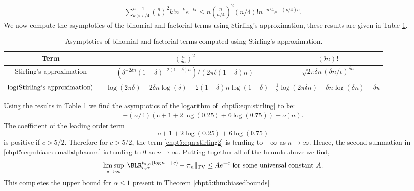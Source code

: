 \documentclass[11pt]{report}
\begin{document}
\begin{eqnarray}
\sum_{k>n/4}^{n-1} {n\choose k}^{2} k! n^{-k} e^{-k c} \leq  n {n\choose n/4}^{2} ( n/4)!  n^{-n/4} e^{-(n/4) c} .\label{chpt5:eqn:stirling}
\end{eqnarray}
We now compute the asymptotics of the binomial and factorial terms using Stirling's approximation, these results are given in Table \ref{chpt4:table:stirlings}. 
\begin{table}[H]
	
	
	\begin{adjustbox}{width=\columnwidth,center}
		\renewcommand{\arraystretch}{1.3}
		\begin{tabular}{c|c|c}
			Term    & ${n\choose \delta n}^{2}$ & $(\delta n)!$  \\\hline
			Stirling's approximation & $(\delta^{-2\delta n} (1-\delta)^{-2(1-\delta)n} ) / (2\pi\delta(1-\delta)n)$ & $\sqrt{2\pi \delta n}\left(\delta n / e\right)^{\delta n}$ \\\hline
			$\log (\textnormal{Stirling's approximation})$ & $-\log(2\pi \delta) -2\delta n\log (\delta) - 2(1-\delta)n\log (1-\delta)$ & $\frac{1}{2}\log(2\pi\delta n) + \delta n \log(\delta n) - \delta n $
		\end{tabular}
		
	\end{adjustbox}
	\caption[Asymptotics of binomial and factorial terms using Stirling's approximation]{Asymptotics of binomial and factorial terms computed using Stirling's approximation.}
	\label{chpt4:table:stirlings}
\end{table}
Using the results in Table \ref{chpt4:table:stirlings} we find the asymptotics of the logarithm of \eqref{chpt5:eqn:stirling} to be:
\begin{eqnarray}
-(n/4)\left( c+ 1 +  2 \log (0.25) +  6\log (0.75) \right) + o(n).\label{chpt5:eqn:stirling2}
\end{eqnarray}
The coefficient of the leading order term
\[c+ 1 +  2 \log (0.25) +  6\log (0.75) \]
is positive if $c>5/2$.	Therefore for $c>5/2$, the term \eqref{chpt5:eqn:stirling2} is tending to $-\infty$ as $n\to\infty$. Hence, the second summation in \eqref{chpt5:eqn:biasedsmallalphasum} is tending to $0$ as $n\to\infty$. Putting together all of the bounds above we find,
\[\limsup_{n\to \infty} \lVert \BLR_{n,\alpha}^{t_{n,\alpha}(\log n+ + c)} - \pi_{n} \rVert_{\tiny \textnormal{TV}} \leq Ae^{-c} \textnormal{ for some universal constant $A$} .\]
This completes the upper bound for $\alpha \leq 1$ present in Theorem \ref{chpt5:thm:biasedbounds}.
\end{document}
